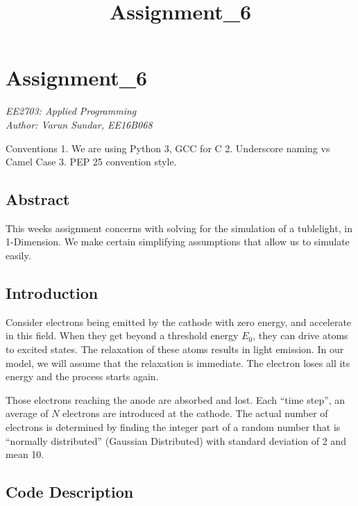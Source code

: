 \documentclass[11pt]{article}
\title{Assignment\_6}
\begin{document}
    
    
    \maketitle
    
    

    
    \hypertarget{assignment_6}{%
\section{Assignment\_6}\label{assignment_6}}

\emph{EE2703: Applied Programming\\
Author: Varun Sundar, EE16B068}

Conventions 1. We are using Python 3, GCC for C 2. Underscore naming vs
Camel Case 3. PEP 25 convention style.

\hypertarget{abstract}{%
\subsection{Abstract}\label{abstract}}

This weeks assignment concerns with solving for the simulation of a
tublelight, in 1-Dimension. We make certain simplifying assumptions that
allow us to simulate easily.

\hypertarget{introduction}{%
\subsection{Introduction}\label{introduction}}

Consider electrons being emitted by the cathode with zero energy, and
accelerate in this field. When they get beyond a threshold energy
\(E_0\), they can drive atoms to excited states. The relaxation of these
atoms results in light emission. In our model, we will assume that the
relaxation is immediate. The electron loses all its energy and the
process starts again.

Those electrons reaching the anode are absorbed and lost. Each ``time
step'', an average of \(N\) electrons are introduced at the cathode. The
actual number of electrons is determined by finding the integer part of
a random number that is ``normally distributed'' (Gaussian Distributed)
with standard deviation of 2 and mean 10.

\hypertarget{code-description}{%
\subsection{Code Description}\label{code-description}}
\end{document}
